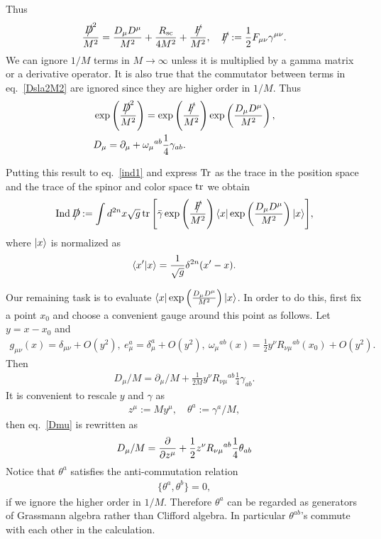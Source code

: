 \documentclass[12pt,a4paper]{article}
\DeclareMathOperator*{\Ind}{\mathrm{Ind}}
\newcommand{\del}{\partial}
\newcommand{\gammab}{\bar{\gamma}}
\newcommand{\Dsla}{D\hspace{-0.65em}\big/}
\newcommand{\Fsla}{F\hspace{-0.6em}\big/}
\newcommand{\Rsc}{R_{\mathrm{sc}}}
\begin{document}
Thus
\begin{align}
  \frac{\Dsla^2}{M^2}=\frac{D_{\mu}D^{\mu}}{M^2}+\frac{\Rsc}{4M^2}+\frac{\Fsla}{M^2},\quad
  \Fsla:=\frac12 F_{\mu\nu}\gamma^{\mu\nu}.
  \label{Dsla2M2}
\end{align}
We can ignore $1/M$ terms in $M\to \infty$ unless it is multiplied by a gamma matrix or a derivative operator. 
It is also true that the commutator between terms in eq.~\eqref{Dsla2M2} are ignored since they are higher order in $1/M$.
Thus
\begin{align*}
   & \exp\left(\frac{\Dsla^2}{M^2}\right)=
  \exp\left(\frac{\Fsla}{M^2}\right)
  \exp\left(\frac{D_{\mu}D^{\mu}}{M^2}\right),                  \\
   & D_{\mu}=\del_{\mu}+\omega_{\mu}{}^{ab}\frac14 \gamma_{ab}.
\end{align*}

Putting this result to eq.~\eqref{ind1} and express $\Tr$ as the trace in the position space and the trace of the spinor and color space $\tr$ we obtain
\begin{align}
  \Ind{\Dsla}:=\int d^{2n}x \sqrt{g}\tr\qty[\gammab
    \exp\left(\frac{\Fsla}{M^2}\right)
    \bra{x}\exp\left(\frac{D_{\mu}D^{\mu}}{M^2}\right)\ket{x}],
  \label{ind2}
\end{align}
where $\ket{x}$ is normalized as
\begin{align}
  \ip{x'}{x}=\frac{1}{\sqrt{g}}\delta^{2n}(x'-x).
\end{align}

Our remaining task is to evaluate $\bra{x}\exp\left(\frac{D_{\mu}D^{\mu}}{M^2}\right)\ket{x}$.  In order to do this, first fix a point $x_0$ and choose a convenient gauge around this point as follows.  Let $y=x-x_0$ and
\begin{align}
  g_{\mu\nu}(x)=\delta_{\mu\nu}+O(y^2),\
  e^{a}_{\mu}=\delta^{a}_{\mu}+O(y^2),\
  \omega_{\mu}{}^{ab}(x)=\frac12 y^{\nu}R_{\nu\mu}{}^{ab}(x_0)+O(y^2).
\end{align}
Then
\begin{align}
  D_{\mu}/M=\del_{\mu}/M+\frac1{2M} y^{\nu}R_{\nu\mu}{}^{ab}\frac14 \gamma_{ab}.\label{Dmu}
\end{align}
It is convenient to rescale $y$ and $\gamma$ as
\begin{align}
  z^{\mu}:=M y^{\mu},\quad \theta^{a}:=\gamma^{a}/M,
\end{align}
then eq.~\eqref{Dmu} is rewritten as
\begin{align}
  D_{\mu}/M=\pdv{z^{\mu}}+\frac1{2} z^{\nu}R_{\nu\mu}{}^{ab}\frac14 \theta_{ab}
\end{align}
Notice that $\theta^a$ satisfies the anti-commutation relation
\begin{align}
  \{\theta^a,\theta^b\}=0,
\end{align}
if we ignore the higher order in $1/M$.  Therefore $\theta^a$ can be regarded as generators of Grassmann algebra rather than Clifford algebra.  In particular $\theta^{ab}$'s commute with each other in the calculation.
\end{document}

